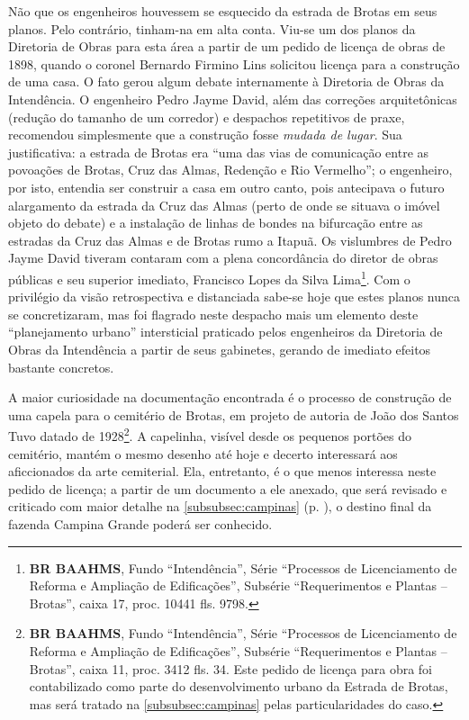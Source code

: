 Não que os engenheiros houvessem se esquecido da estrada de Brotas em seus planos. Pelo contrário, tinham-na em alta conta. Viu-se um dos planos da Diretoria de Obras para esta área a partir de um pedido de licença de obras de 1898, quando o coronel Bernardo Firmino Lins solicitou licença para a construção de uma casa. O fato gerou algum debate internamente à Diretoria de Obras da Intendência. O engenheiro Pedro Jayme David, além das correções arquitetônicas (redução do tamanho de um corredor) e despachos repetitivos de praxe, recomendou simplesmente que a construção fosse \textit{mudada de lugar}. Sua justificativa: a estrada de Brotas era ``uma das vias de comunicação entre as povoações de Brotas, Cruz das Almas, Redenção e Rio Vermelho''; o engenheiro, por isto, entendia ser construir a casa em outro canto, pois antecipava o futuro alargamento da estrada da Cruz das Almas (perto de onde se situava o imóvel objeto do debate) e a instalação de linhas de bondes na bifurcação entre as estradas da Cruz das Almas e de Brotas rumo a Itapuã. Os vislumbres de Pedro Jayme David tiveram contaram com a plena concordância do diretor de obras públicas e seu superior imediato, Francisco Lopes da Silva Lima\footnote{\textbf{BR BAAHMS}, Fundo ``Intendência'', Série ``Processos de Licenciamento de Reforma e Ampliação de Edificações'', Subsérie ``Requerimentos e Plantas -- Brotas'', caixa 17, proc. 10441 fls. 9798.}. Com o privilégio da visão retrospectiva e distanciada sabe-se hoje que estes planos nunca se concretizaram, mas foi flagrado neste despacho mais um elemento deste ``planejamento urbano'' intersticial praticado pelos engenheiros da Diretoria de Obras da Intendência a partir de seus gabinetes, gerando de imediato efeitos bastante concretos.


A maior curiosidade na documentação encontrada é o processo de construção de uma capela para o cemitério de Brotas, em projeto de autoria de João dos Santos Tuvo datado de 1928\footnote{\textbf{BR BAAHMS}, Fundo ``Intendência'', Série ``Processos de Licenciamento de Reforma e Ampliação de Edificações'', Subsérie ``Requerimentos e Plantas -- Brotas'', caixa 11, proc. 3412 fls. 34. Este pedido de licença para obra foi contabilizado como parte do desenvolvimento urbano da Estrada de Brotas, mas será tratado na \autoref{subsubsec:campinas} pelas particularidades do caso.}. A capelinha, visível desde os pequenos portões do cemitério, mantém o mesmo desenho até hoje e decerto interessará aos aficcionados da arte cemiterial. Ela, entretanto, é o que menos interessa neste pedido de licença; a partir de um documento a ele anexado, que será revisado e criticado com maior detalhe na \autoref{subsubsec:campinas} (p. \pageref{subsubsec:campinas}), o destino final da fazenda Campina Grande poderá ser conhecido.


